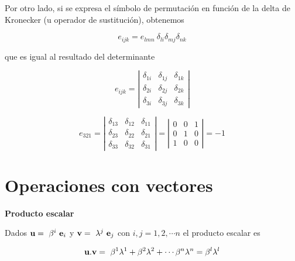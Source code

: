 \bigskip

Por otro lado, si se expresa el símbolo de permutación en función de la delta de Kronecker (u operador de sustitución), obtenemos

\begin{equation}
e_{ijk}=e_{lmn}~\delta_{li}\delta_{mj}\delta_{nk}
\end{equation}

\bigskip

\noindent
que es igual al resultado del determinante 


\[
e_{ijk}=\left  | \begin{array}{ccc}
\delta_{1i}  &\delta_{1j}   & \delta_{1k}  \\
\delta_{2i}  &  \delta_{2j}   &  \delta_{2k}  \\
\delta_{3i}  &  \delta_{3j}   &  \delta_{3k}  
\end{array}
\right|
\]


\begin{example}
 \[
e_{321}=\left  | \begin{array}{ccc}
\delta_{13}  &\delta_{12}   & \delta_{11}  \\
\delta_{23}  &  \delta_{22}   &  \delta_{21}  \\
\delta_{33}  &  \delta_{32}   &  \delta_{31}  
\end{array}
\right|= \left  | \begin{array}{ccc}
0  & 0   & 1  \\
0  &  1   &  0  \\
1  & 0   &  0  
\end{array}
\right|= -1
\]   
\end{example}

\section{Operaciones con vectores}
\noindent
\textbf{Producto escalar}

Dados 
$\bold{u}=~\beta^i~\bold{e}_i$ y  $\bold{v}=~\lambda^j~\bold{e}_j$ con $i,j=1,2, \cdots  n$
el producto escalar es 

\bigskip


$$\bold{u}.\bold{v}=~\beta^1 \lambda^1+ \beta^2 \lambda^2+ \cdots\beta^n\lambda^n = \beta^l\lambda^l $$



\bigskip


